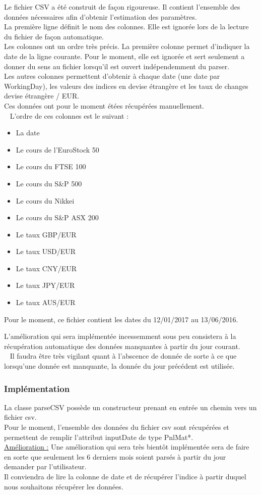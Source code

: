 \documentclass[a4paper,12pt]{article}
\begin{document}
Le fichier CSV a été construit de façon rigoureuse. Il contient l'ensemble des données nécessaires afin d'obtenir l'estimation des paramètres. \\ 
La première ligne définit le nom des colonnes. Elle est ignorée lors de la lecture du fichier de façon automatique. \\ 
Les colonnes ont un ordre très précis. La première colonne permet d'indiquer la date de la ligne courante. Pour le moment, elle est ignorée et sert seulement a donner du sens au fichier lorsqu'il est ouvert indépendemment du parser. \\ 
Les autres colonnes permettent d'obtenir à chaque date (une date par WorkingDay), les valeurs des indices en devise étrangère et les taux de changes devise étrangère / EUR. \\ 
Ces données ont pour le moment étées récupérées manuellement. \\ 
L'ordre de ces colonnes est le suivant :
\begin{itemize}
    \item La date
    \item Le cours de l'EuroStock 50
    \item Le cours du FTSE 100
    \item Le cours du S\&P 500
    \item Le cours du Nikkei 
    \item Le cours du S\&P ASX 200
    \item Le taux GBP/EUR
    \item Le taux USD/EUR
    \item Le taux CNY/EUR
    \item Le taux JPY/EUR 
    \item Le taux AUS/EUR
\end{itemize}

Pour le moment, ce fichier contient les dates du 12/01/2017 au 13/06/2016. 

L'amélioration qui sera implémentée incessemment sous peu consistera à la récupération automatique des données manquantes à partir du jour courant. \\ 
Il faudra être très vigilant quant à l'abscence de donnée de sorte à ce que lorsqu'une donnée est manquante, la donnée du jour précédent est utilisée.


\subsubsection{Implémentation}
La classe parseCSV possède un constructeur prenant en entrée un chemin vers un fichier csv. \\
Pour le moment, l'ensemble des données du fichier csv sont récupérées et permettent de remplir l'attribut inputDate de type PnlMat*.\\
\underline{Amélioration :} Une amélioration qui sera très bientôt implémentée sera de faire en sorte que seulement les 6 derniers mois soient parsés à partir du jour demander par l'utilisateur. \\ 
Il conviendra de lire la colonne de date et de récupérer l'indice à partir duquel nous souhaitons récupérer les données. 
\end{document}
